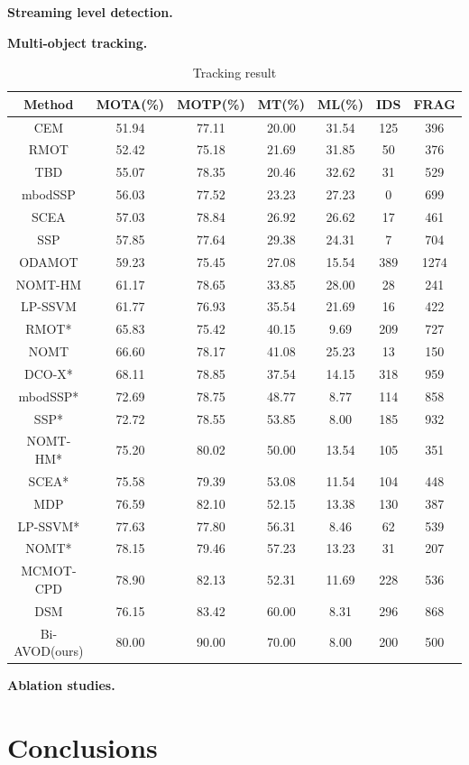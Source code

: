 \documentclass{bmvc2k}
\begin{document}
\textbf{Streaming level detection.} 

\textbf{Multi-object tracking.}

\begin{table}[]\centering
	\small
	\begin{tabular}{ccccccc}
		\hline
		Method        & MOTA(\%) & MOTP(\%) & MT(\%) & ML(\%) & IDS & FRAG \\ \hline
		CEM           & 51.94    & 77.11    & 20.00  & 31.54  & 125 & 396  \\
		RMOT          & 52.42    & 75.18    & 21.69  & 31.85  & 50  & 376  \\
		TBD           & 55.07    & 78.35    & 20.46  & 32.62  & 31  & 529  \\
		mbodSSP       & 56.03    & 77.52    & 23.23  & 27.23  & 0   & 699  \\
		SCEA          & 57.03    & 78.84    & 26.92  & 26.62  & 17  & 461  \\
		SSP           & 57.85    & 77.64    & 29.38  & 24.31  & 7   & 704  \\
		ODAMOT        & 59.23    & 75.45    & 27.08  & 15.54  & 389 & 1274 \\
		NOMT-HM       & 61.17    & 78.65    & 33.85  & 28.00  & 28  & 241  \\
		LP-SSVM       & 61.77    & 76.93    & 35.54  & 21.69  & 16  & 422  \\
		RMOT*         & 65.83    & 75.42    & 40.15  & 9.69   & 209 & 727  \\
		NOMT          & 66.60    & 78.17    & 41.08  & 25.23  & 13  & 150  \\
		DCO-X*        & 68.11    & 78.85    & 37.54  & 14.15  & 318 & 959  \\
		mbodSSP*      & 72.69    & 78.75    & 48.77  & 8.77   & 114 & 858  \\
		SSP*          & 72.72    & 78.55    & 53.85  & 8.00   & 185 & 932  \\
		NOMT-HM*      & 75.20    & 80.02    & 50.00  & 13.54  & 105 & 351  \\
		SCEA*         & 75.58    & 79.39    & 53.08  & 11.54  & 104 & 448  \\
		MDP           & 76.59    & 82.10    & 52.15  & 13.38  & 130 & 387  \\
		LP-SSVM*      & 77.63    & 77.80    & 56.31  & 8.46   & 62  & 539  \\
		NOMT*         & 78.15    & 79.46    & 57.23  & 13.23  & 31  & 207  \\
		MCMOT-CPD     & 78.90    & 82.13    & 52.31  & 11.69  & 228 & 536  \\
		DSM           & 76.15    & 83.42    & 60.00  & 8.31   & 296 & 868  \\ \hline
		Bi-AVOD(ours) & 80.00    & 90.00    & 70.00  & 8.00   & 200 & 500  \\ \hline
	\end{tabular}
	\setlength{\abovecaptionskip}{1pt}
	\caption{Tracking result}
	\label{label:result_tracking}
\end{table}

\textbf{Ablation studies.}



\section{Conclusions}
\label{sec:conclusions}



\end{document}
